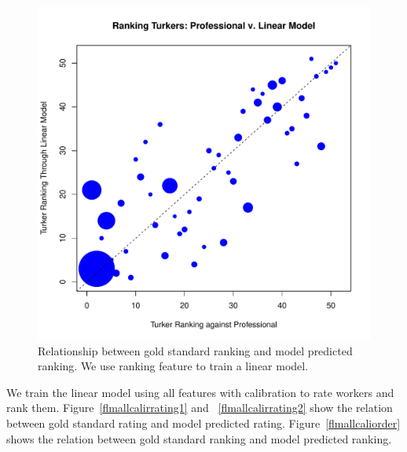 \documentclass[11pt]{article}
\begin{document}
\begin{figure}[htbp]
  \centering
  \includegraphics[width=\linewidth]{RankingFeature/rankfeatureorderlm.pdf}
  \caption{Relationship between gold standard ranking and model predicted ranking. We use ranking feature to train a linear model. }
    \label{flmrankingorder}
\end{figure}
We train the linear model using all features with calibration to rate workers and rank them. Figure~\ref{flmallcalirrating1} and ~\ref{flmallcalirrating2} show the relation between gold standard rating and model predicted rating. Figure~\ref{flmallcaliorder} shows the relation between gold standard ranking and model predicted ranking.
\end{document}
